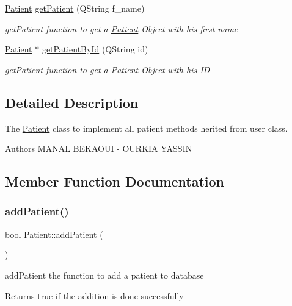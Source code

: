 \begin{DoxyCompactItemize}
\mbox{\hyperlink{class_patient}{Patient}} \mbox{\hyperlink{class_patient_aa6017acec4a2b7d3257912f22cc12753}{get\+Patient}} (Q\+String f\+\_\+name)
\begin{DoxyCompactList}\small\item\em get\+Patient function to get a \mbox{\hyperlink{class_patient}{Patient}} Object with his first name \end{DoxyCompactList}\item 
\mbox{\hyperlink{class_patient}{Patient}} $\ast$ \mbox{\hyperlink{class_patient_a92b5c595605e0f679cff9c4f286c183b}{get\+Patient\+By\+Id}} (Q\+String id)
\begin{DoxyCompactList}\small\item\em get\+Patient function to get a \mbox{\hyperlink{class_patient}{Patient}} Object with his ID \end{DoxyCompactList}\end{DoxyCompactItemize}


\subsection{Detailed Description}
The \mbox{\hyperlink{class_patient}{Patient}} class to implement all patient methods herited from user class. 

\begin{DoxyAuthor}{Authors}
M\+A\+N\+AL B\+E\+K\+A\+O\+UI -\/ O\+U\+R\+K\+IA Y\+A\+S\+S\+IN 
\end{DoxyAuthor}


\subsection{Member Function Documentation}
\mbox{\label{class_patient_ae6aa7dee3e8d59eaaad1c289f295ee51}} 
\subsubsection{\texorpdfstring{addPatient()}{addPatient()}}
{\footnotesize\ttfamily bool Patient\+::add\+Patient (\begin{DoxyParamCaption}{ }\end{DoxyParamCaption})}



add\+Patient the function to add a patient to database 

\begin{DoxyReturn}{Returns}
true if the addition is done successfully 
\end{DoxyReturn}
\mbox{\label{class_patient_a39280c0d0686de60cedd2fddc8dfb229}} 
